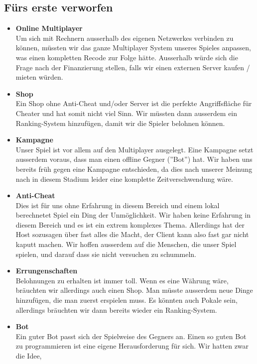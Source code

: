 \subsection*{Fürs erste verworfen}
\begin{itemize}
    \item \textbf{Online Multiplayer} \\
        Um sich mit Rechnern ausserhalb des eigenen Netzwerkes verbinden zu können, müssten wir das ganze Multiplayer System unseres Spieles anpassen, was einen kompletten Recode zur Folge hätte. 
        Ausserhalb würde sich die Frage nach der Finanzierung stellen, falls wir einen externen Server kaufen / mieten würden. 
    \item \textbf{Shop} \\
        Ein Shop ohne Anti-Cheat und/oder Server ist die perfekte Angriffsfläche für Cheater und hat somit nicht viel Sinn. Wir müssten dann ausserdem ein Ranking-System
        hinzufügen, damit wir die Spieler belohnen können.
    \item \textbf{Kampagne} \\
        Unser Spiel ist vor allem auf den Multiplayer ausgelegt. Eine Kampagne setzt ausserdem voraus, dass man einen offline Gegner (''Bot'') hat. Wir haben uns bereits 
        früh gegen eine Kampagne entschieden, da dies nach unserer Meinung nach in diesem Stadium leider eine komplette Zeitverschwendung wäre.
    \item \textbf{Anti-Cheat} \\
        Dies ist für uns ohne Erfahrung in diesem Bereich und einem lokal berechnetet Spiel ein Ding der Unmöglichkeit.
        Wir haben keine Erfahrung in diesem Bereich und es ist ein extrem komplexes Thema. Allerdings hat der Host sozusagen über fast alles die Macht, der Client kann also fast
        gar nicht kaputt machen. Wir hoffen ausserdem auf die Menschen, die unser Spiel spielen, und darauf dass sie nicht versuchen zu schummeln.
    \item \textbf{Errungenschaften} \\
        Belohnungen zu erhalten ist immer toll. Wenn es eine Währung wäre, bräuchten wir allerdings auch einen Shop. Man müsste ausserdem neue Dinge hinzufügen,
        die man zuerst erspielen muss. Es könnten auch Pokale sein, allerdings bräuchten wir dann bereits wieder ein Ranking-System.
    \item \textbf{Bot} \\
        Ein guter Bot passt sich der Spielweise des Gegners an. Einen so guten Bot zu programmieren ist eine eigene Herausforderung für sich. Wir hatten zwar die Idee,

\end{itemize}
